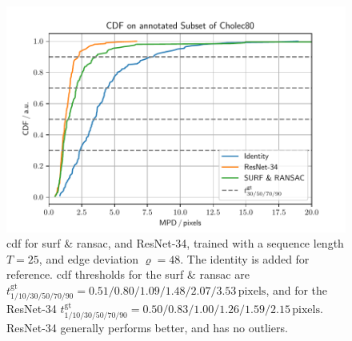 \begin{figure}[tb]
\centering
\includegraphics[width=\textwidth]{fig/frac/cdf.pdf}
\caption{\gls{cdf} for \gls{surf} \& \gls{ransac}, and ResNet-34, trained with a sequence length $T=25$, and edge deviation $\varrho=48$. The identity is added for reference. \gls{cdf} thresholds for the \gls{surf} \& \gls{ransac} are $t^\text{gt}_{1/10/30/50/70/90} = 0.51/0.80/1.09/1.48/2.07/3.53\,\text{pixels}$, and for the ResNet-34 $t^\text{gt}_{1/10/30/50/70/90} = 0.50/0.83/1.00/1.26/1.59/2.15\,\text{pixels}$. ResNet-34 generally performs better, and has no outliers.}
\label{c3:fig:resnet34_c}
\end{figure}


